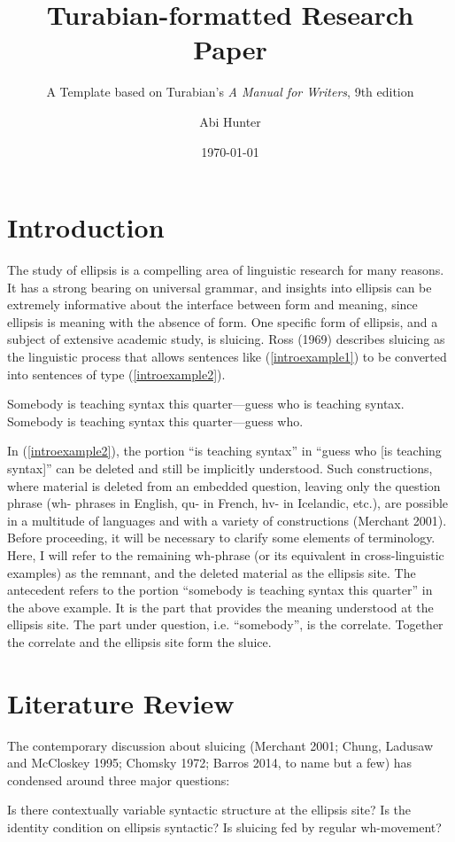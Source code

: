 \documentclass{turabian-researchpaper}
\title{Turabian-formatted Research Paper}
\subtitle{A Template based on Turabian's \emph{A Manual for Writers}, 9th edition}
\author{Abi Hunter}
\date{\today}
\begin{document}
\maketitle


\section{Introduction}

The study of ellipsis is a compelling area of linguistic research for many reasons. It has a strong bearing on universal grammar, and insights into ellipsis can be extremely informative about the interface between form and meaning, since ellipsis is meaning with the absence of form. One specific form of ellipsis, and a subject of extensive academic study, is sluicing. Ross (1969) describes sluicing as the linguistic process that allows sentences like (\ref{introexample1}) to be converted into sentences of type (\ref{introexample2}). 

\begin{exe}
\ex\label{introexample1} Somebody is teaching syntax this quarter---guess who is teaching syntax. 
\ex\label{introexample2} Somebody is teaching syntax this quarter---guess who. 
\end{exe} 

In (\ref{introexample2}), the portion ``is teaching syntax'' in ``guess who [is teaching syntax]'' can be deleted and still be implicitly understood. Such constructions, where material is deleted from an embedded question, leaving only the question phrase (wh- phrases in English, qu- in French, hv- in Icelandic, etc.), are possible in a multitude of languages and with a variety of constructions (Merchant 2001).  Before proceeding, it will be necessary to clarify some elements of terminology. Here, I will refer to the remaining wh-phrase (or its equivalent in cross-linguistic examples) as the remnant, and the deleted material as the ellipsis site. The antecedent refers to the portion ``somebody is teaching syntax this quarter'' in the above example. It is the part that provides the meaning understood at the ellipsis site. The part under question, i.e. ``somebody'', is the correlate. Together the correlate and the ellipsis site form the sluice. 

\section{Literature Review}
The contemporary discussion about sluicing (Merchant 2001; Chung, Ladusaw and McCloskey 1995; Chomsky 1972; Barros 2014, to name but a few) has condensed around three major questions: 
\begin{exe}
\ex\label{bigquestions} 
\begin{xlist}
\ex Is there contextually variable syntactic structure at the ellipsis site? 
\ex Is the identity condition on ellipsis syntactic? 
\ex Is sluicing fed by regular wh-movement? 
\end{xlist}
\end{exe}
\end{document}
